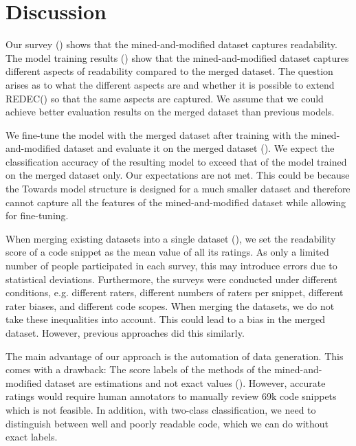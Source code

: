 \documentclass[%
class=scrreprt,
chapterprefix=false,%
open=right,%
twoside=true,%
paper=a4,%
logofile={Logo\_zentral\_farbig\_EN.png},%
thesistype=master,%
UKenglish,%
]{se2thesis}
\theoremstyle{definition}
\newcommand{\citeolddataset}{\cite{buse2009learning, dorn2012general, scalabrino2018comprehensive}\xspace}
\newcommand{\numSamples}{69k\xspace}
\newcommand{\rdh}{REDEC\xspace}
\begin{document}
\chapter{Discussion} \label{Discussion}

	Our survey () shows that the mined-and-modified dataset captures readability. The model training results () show that the mined-and-modified dataset captures different aspects of readability compared to the merged dataset. 	
	The question arises as to what the different aspects are and whether it is possible to extend \rdh () so that the same aspects are captured. We assume that we could achieve better evaluation results on the merged dataset than previous models.
	
	We fine-tune the model with the merged dataset after training with the mined-and-modified dataset and evaluate it on the merged dataset (). We expect the classification accuracy of the resulting model to exceed that of the model trained on the merged dataset only.
	Our expectations are not met. This could be because the Towards model structure is designed for a much smaller dataset and therefore cannot capture all the features of the mined-and-modified dataset while allowing for fine-tuning.

	When merging existing datasets \citeolddataset into a single dataset (), we set the readability score of a code snippet as the mean value of all its ratings. As only a limited number of people participated in each survey, this may introduce errors due to statistical deviations.
	Furthermore, the surveys were conducted under different conditions, e.g. different raters, different numbers of raters per snippet, different rater biases, and different code scopes. When merging the datasets, we do not take these inequalities into account. This could lead to a bias in the merged dataset. However, previous approaches did this similarly.
	
	The main advantage of our approach is the automation of data generation.
	This comes with a drawback: The score labels of the methods of the mined-and-modified dataset are estimations and not exact values (). However, accurate ratings would require human annotators to manually review \numSamples code snippets which is not feasible. In addition, with two-class classification, we need to distinguish between well and poorly readable code, which we can do without exact labels.
	
\end{document}
